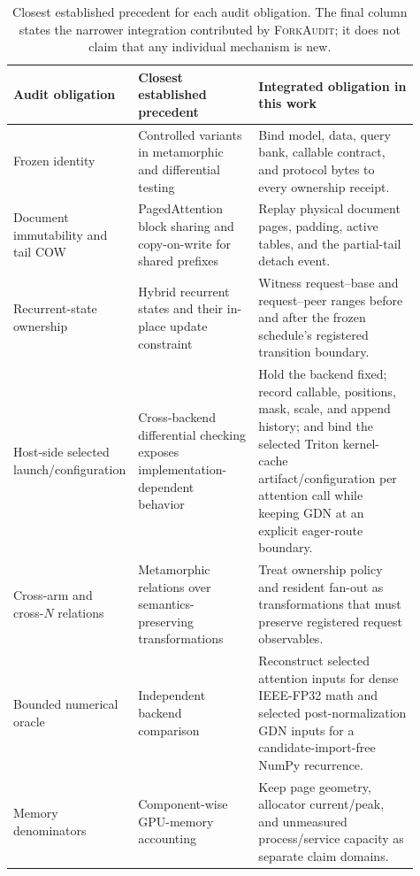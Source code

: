 \documentclass{article}
\newcommand{\method}{\textsc{ForkAudit}}
\begin{document}
\begin{table}[H]
\caption{Closest established precedent for each audit obligation.  The final
column states the narrower integration contributed by \method{}; it does not
claim that any individual mechanism is new.}
\centering\scriptsize
\begin{tabular}{@{}p{0.18\linewidth}p{0.31\linewidth}p{0.42\linewidth}@{}}
\toprule
Audit obligation & Closest established precedent & Integrated obligation in this work \\
\midrule
Frozen identity & Controlled variants in metamorphic and differential testing~\citep{chen2018metamorphic,xiao2022metamorphic,pham2019cradle} & Bind model, data, query bank, callable contract, and protocol bytes to every ownership receipt. \\
Document immutability and tail COW & PagedAttention block sharing and copy-on-write for shared prefixes~\citep{kwon2023pagedattention} & Replay physical document pages, padding, active tables, and the partial-tail detach event. \\
Recurrent-state ownership & Hybrid recurrent states and their in-place update constraint~\citep{yang2025gateddeltanet,pan2025marconi} & Witness request--base and request--peer ranges before and after the frozen schedule's registered transition boundary. \\
Host-side selected launch/configuration & Cross-backend differential checking exposes implementation-dependent behavior~\citep{pham2019cradle} & Hold the backend fixed; record callable, positions, mask, scale, and append history; and bind the selected Triton kernel-cache artifact/configuration per attention call while keeping GDN at an explicit eager-route boundary. \\
Cross-arm and cross-$N$ relations & Metamorphic relations over semantics-preserving transformations~\citep{chen2018metamorphic,xiao2022metamorphic} & Treat ownership policy and resident fan-out as transformations that must preserve registered request observables. \\
Bounded numerical oracle & Independent backend comparison~\citep{pham2019cradle} & Reconstruct selected attention inputs for dense IEEE-FP32 math and selected post-normalization GDN inputs for a candidate-import-free NumPy recurrence. \\
Memory denominators & Component-wise GPU-memory accounting~\citep{gao2020dnnmem} & Keep page geometry, allocator current/peak, and unmeasured process/service capacity as separate claim domains. \\
\bottomrule
\end{tabular}
\end{table}
\end{document}
